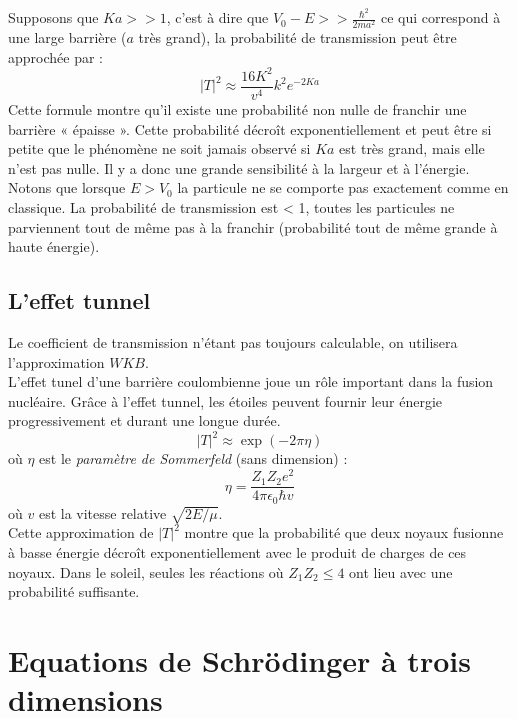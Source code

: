 \documentclass[british,french,11pt, a4paper, openany]{book}
\begin{document}
	Supposons que $Ka >> 1$, c'est à dire que $V_0 - E >> \frac{\hbar^2}{2ma^2}$ ce qui correspond à une large barrière ($a$ très grand), la probabilité de transmission peut être approchée par :
	\begin{equation}
		|T|^2 \approx \frac{16K^2}{v^4}k^2e^{-2Ka}
	\end{equation}
	Cette formule montre qu'il existe une probabilité non nulle de franchir une barrière
	« épaisse ». Cette probabilité décroît exponentiellement et peut être si petite que le
	phénomène ne soit jamais observé si $Ka$ est très grand, mais elle n'est pas nulle. Il y a donc une grande sensibilité à la largeur et à l'énergie.\\
	
	Notons que lorsque $E > V_0$ la particule ne se comporte pas exactement comme en classique. La probabilité de transmission est < 1, toutes les particules ne parviennent tout de même pas à la franchir (probabilité tout de même grande à  haute énergie).
	
	
	\section{L'effet tunnel}
	Le coefficient de transmission n'étant pas toujours calculable, on utilisera l'approximation $WKB$.\\
	
	L'effet tunel d'une barrière coulombienne joue un rôle important dans la fusion nucléaire. Grâce à l'effet tunnel, les étoiles peuvent fournir leur énergie progressivement et durant une longue durée.
	\begin{equation}
		|T|^2 \approx \exp(-2\pi\eta)
	\end{equation}
	où $\eta$ est le \textit{paramètre de Sommerfeld} (sans dimension) :
	\begin{equation}
		\eta = \frac{Z_1Z_2e^2}{4\pi\epsilon_0\hbar v}
	\end{equation}
	où $v$ est la vitesse relative $\sqrt{2E/\mu}$.\\
	
	Cette approximation de $|T|^2$ montre que la probabilité que deux noyaux fusionne à basse énergie décroît exponentiellement avec le produit de charges de ces noyaux. 
	Dans le soleil, seules les réactions où $Z_1Z_2 \leq 4$ ont lieu avec une probabilité suffisante.\\
	\chapter{Equations de Schrödinger à trois dimensions}
\end{document}

